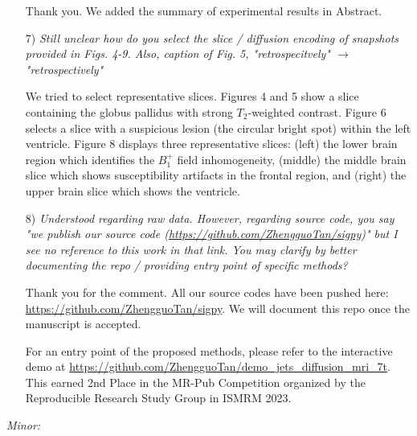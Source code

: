\documentclass[a4paper,11pt,twoside]{report}
\begin{document}
\begin{enumerate}
    \hspace{1em} {\color{blue} Thank you.
    We added the summary of experimental results in Abstract.}

    \item [7)] \textit{Still unclear how do you select the slice / diffusion encoding of snapshots provided in Figs. 4-9. Also, caption of Fig. 5, "retrospecitvely" $\rightarrow$ "retrospectively"}

    \hspace{1em} {\color{blue}
    We tried to select representative slices.
    Figures 4 and 5 show a slice containing the globus pallidus
    with strong $T_2$-weighted contrast.
    Figure 6 selects a slice with a suspicious lesion
    (the circular bright spot)
    within the left ventricle.
    Figure 8 displays three representative slices:
    (left) the lower brain region
    which identifies the $B_1^+$ field inhomogeneity,
    (middle) the middle brain slice
    which shows susceptibility artifacts in the frontal region,
    and (right) the upper brain slice
    which shows the ventricle.}

    \item [8)] \textit{Understood regarding raw data. However, regarding source code, you say "we publish our source code (\url{https://github.com/ZhengguoTan/sigpy})" but I see no reference to this work in that link. You may clarify by better documenting the repo / providing entry point of specific methods?}

    \hspace{1em} {\color{blue} Thank you for the comment.
    All our source codes have been pushed here:
    \url{https://github.com/ZhengguoTan/sigpy}.
    We will document this repo once the manuscript is accepted.

    \hspace{1em} For an entry point of the proposed methods,
    please refer to the interactive demo at
    \url{https://github.com/ZhengguoTan/demo_jets_diffusion_mri_7t}.
    This earned 2nd Place in the MR-Pub Competition
    organized by the Reproducible Research Study Group in ISMRM 2023.}

\end{enumerate}


\noindent \textit{Minor:}
\end{document}

